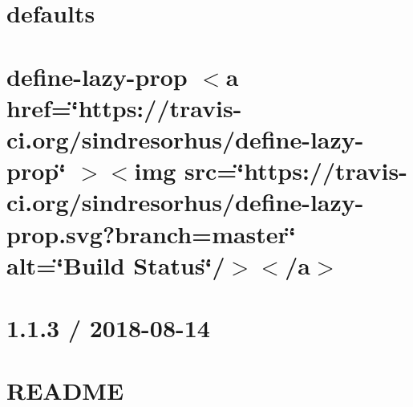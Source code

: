 \documentclass[twoside]{book}
\newcommand{\+}{\discretionary{\mbox{\scriptsize$\hookleftarrow$}}{}{}}
\begin{document}
\chapter{defaults}
\label{md__c___users_vaishnavi_jadhav__desktop__developer_code_mean_stack_example_client_node_modules_defaults__r_e_a_d_m_e}

\chapter{define-\/lazy-\/prop \texorpdfstring{$<$}{<}a href=\char`\"{}https\+://travis-\/ci.\+org/sindresorhus/define-\/lazy-\/prop\char`\"{} \texorpdfstring{$>$}{>}\texorpdfstring{$<$}{<}img src=\char`\"{}https\+://travis-\/ci.\+org/sindresorhus/define-\/lazy-\/prop.\+svg?branch=master\char`\"{} alt=\char`\"{}\+Build Status\char`\"{}/\texorpdfstring{$>$}{>}\texorpdfstring{$<$}{<}/a\texorpdfstring{$>$}{>}}
\label{md__c___users_vaishnavi_jadhav__desktop__developer_code_mean_stack_example_client_node_modules_define_lazy_prop_readme}

\chapter{1.1.3 / 2018-\/08-\/14}
\label{md__c___users_vaishnavi_jadhav__desktop__developer_code_mean_stack_example_client_node_modules_d9107df3d113c26ca6323d505d4cecc0c}

\chapter{README}
\label{md__c___users_vaishnavi_jadhav__desktop__developer_code_mean_stack_example_client_node_modules_define_properties__r_e_a_d_m_e}

\end{document}

